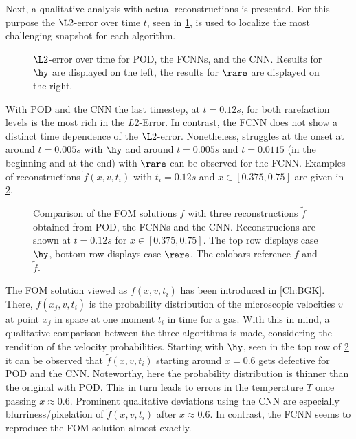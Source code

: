 Next, a qualitative analysis with actual reconstructions is presented. For this purpose the \(\L2\)-error over time \(t\), seen in \cref{Fig:ErrTime}, is used to localize the most challenging snapshot for each algorithm.\\ 
\begin{figure}[tp!]
	
	\caption{\(\L2\)-error over time for POD, the FCNNs, and the CNN. Results for $\hy$ are displayed on the left, the results for $\rare$ are displayed on the right.}
	\label{Fig:ErrTime}
\end{figure}
With POD and the CNN the last timestep, at $t=0.12s$, for both rarefaction levels is the most rich in the $L2$-Error. In contrast, the FCNN does not show a distinct time dependence of the \(\L2\)-error. Nonetheless, struggles at the onset at around $t=0.005s$ with $\hy$ and around \(t=0.005s\) and \(t=0.0115\) (in the beginning and at the end) with $\rare$ can be observed for the FCNN. Examples of reconstructions $\tilde{f}(x,v,t_i)$ with $t_i=0.12s$ and $x \in [0.375,0.75]$ are given in \cref{Fig: ErrWorst}.\\
\begin{figure}[tp!]
	
	\caption{Comparison of the FOM solutions \(f\) with three reconstructions \(\tilde{f}\) obtained from POD, the FCNNs and the CNN. Reconstrucions are shown at \(t=0.12s\) for \(x\in [0.375,0.75]\). The top row displays case $\hy$, bottom row displays case $\rare$. The colobars reference \(f\) and \(\tilde{f}\).}
	\label{Fig: ErrWorst}
\end{figure}
The FOM solution viewed as $f(x,v,t_i)$ has been introduced in \cref{Ch:BGK}. There, $f(x_j,v,t_i)$ is the probability distribution of the microscopic velocities $v$ at point $x_j$ in space at one moment $t_i$ in time for a gas.
With this in mind, a qualitative comparison between the three algorithms is made, considering the rendition of the velocity probabilities. Starting with \(\hy\), seen in the top row of \cref{Fig: ErrWorst} it can be observed that \(\tilde{f}(x,v,t_i)\) starting around \(x=0.6\) gets defective for POD and the CNN. Noteworthy, here the probability distribution is thinner than the original with POD. This in turn leads to errors in the temperature \(T\) once passing \(x\approx 0.6\). Prominent qualitative deviations using the CNN are especially blurriness/pixelation of \(\tilde{f}(x,v,t_i)\) after \(x\approx 0.6\). In contrast, the FCNN seems to reproduce the FOM solution almost exactly.\\

